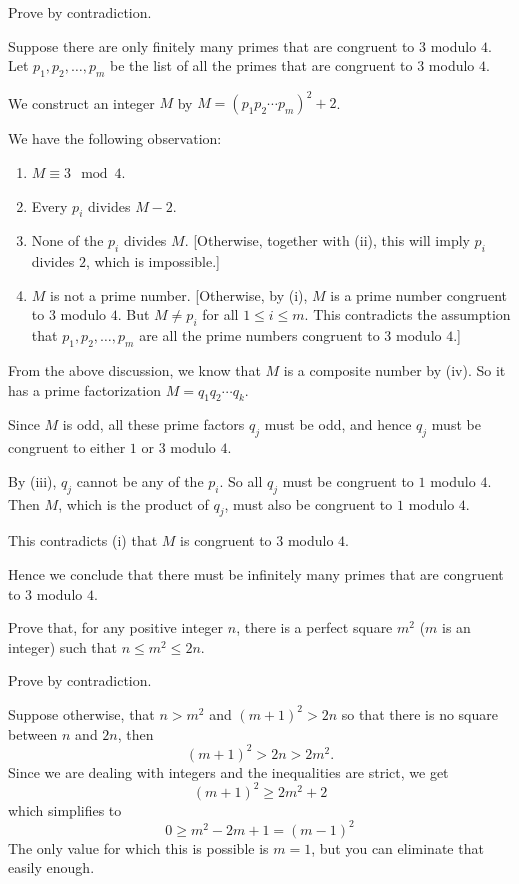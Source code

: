 \begin{solution}
Prove by contradiction.

Suppose there are only finitely many primes that are congruent to $3$ modulo $4$. Let $p_1,p_2,\dots,p_m$ be the list of all the primes that are congruent to $3$ modulo $4$.

We construct an integer $M$ by $M=(p_1p_2\cdots p_m)^2+2$.

We have the following observation:
\begin{enumerate}[label=(\roman*)]
\item  $M\equiv 3 \mod 4$.
\item Every $p_i$ divides $M-2$.
\item None of the $p_i$ divides $M$. [Otherwise, together with (ii), this will imply $p_i$ divides $2$, which is impossible.]
\item $M$ is not a prime number. [Otherwise, by (i), $M$ is a prime number congruent to $3$ modulo $4$. But $M\neq p_i$ for all $1\le i\le m$. This contradicts the assumption that $p_1,p_2,\dots,p_m$ are all the prime numbers congruent to $3$ modulo $4$.]
\end{enumerate}

From the above discussion, we know that $M$ is a composite number by (iv). So it has a prime factorization $M=q_1q_2\cdots q_k$.

Since $M$ is odd, all these prime factors $q_j$ must be odd, and hence $q_j$ must be congruent to either $1$ or $3$ modulo $4$.

By (iii), $q_j$ cannot be any of the $p_i$. So all $q_j$ must be congruent to $1$ modulo $4$. Then $M$, which is the product of $q_j$, must also be congruent to $1$ modulo $4$.

This contradicts (i) that $M$ is congruent to $3$ modulo $4$.

Hence we conclude that there must be infinitely many primes that are congruent to $3$ modulo $4$.
\end{solution}

\begin{exercise}
Prove that, for any positive integer $n$, there is a perfect square $m^2$ ($m$ is an integer) such that $n\le m^2\le 2n$.
\end{exercise}

\begin{solution}
Prove by contradiction.

Suppose otherwise, that $n>m^2$ and $(m+1)^2>2n$ so that there is no square between $n$ and $2n$, then
\[ (m+1)^2>2n>2m^2. \]
Since we are dealing with integers and the inequalities are strict, we get
\[ (m+1)^2\ge2m^2+2 \]
which simplifies to
\[ 0\ge m^2-2m+1=(m-1)^2 \]
The only value for which this is possible is $m=1$, but you can eliminate that easily enough.
\end{solution}

